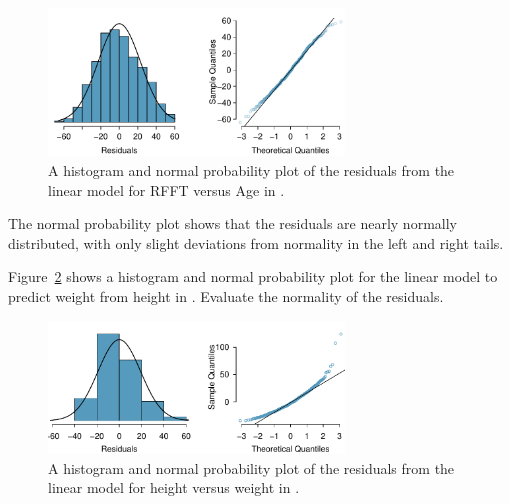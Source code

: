 \begin{figure}[h]
	\centering
	\includegraphics[width=0.7\textwidth]
	{ch_simple_linear_regression_oi_biostat/figures/prevendResidNormPlot/prevendResidNormPlot.pdf}
	\caption{A histogram and normal probability plot of the residuals from the linear model for RFFT versus Age in .}
	\label{prevendResidNormPlot}
\end{figure}

The normal probability plot shows that the residuals are nearly normally distributed, with only slight deviations from normality in the left and right tails.

\begin{exercisewrap}
\begin{nexercise}
Figure~\ref{nhanesResidNormPlot} shows a histogram and normal probability plot for the linear model to predict weight from height in . Evaluate the normality of the residuals.\footnotemark{}
\end{nexercise}
\end{exercisewrap}

\begin{figure}[h]
	\centering
	\includegraphics[width=0.7\textwidth]
	{ch_simple_linear_regression_oi_biostat/figures/nhanesHeightWeightResiduals/nhanesHeightWeightResiduals.pdf}
	\caption{A histogram and normal probability plot of the residuals from the linear model for height versus weight in . }
	\label{nhanesResidNormPlot}
\end{figure}

